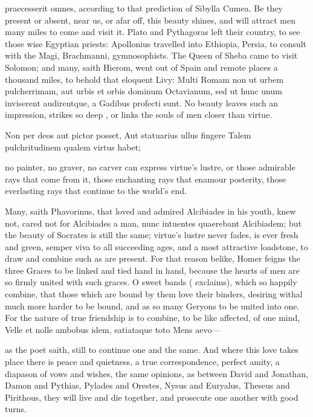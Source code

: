 {praecesserit omnes, according to that prediction of Sibylla
Cumea. Be they present or absent, near us, or afar off, this beauty
shines, and will attract men many miles to come and visit it. Plato and
Pythagoras left their country, to see those wise Egyptian priests:
Apollonius travelled into Ethiopia, Persia, to consult with the Magi,
Brachmanni, gymnosophists. The Queen of Sheba came to visit Solomon;
and many, saith Hierom, went out of Spain and remote places a
thousand miles, to behold that eloquent Livy: Multi Romam non ut
urbem pulcherrimam, aut urbis et orbis dominum Octavianum, sed ut hunc
unum inviserent audirentque, a Gadibus profecti sunt. No beauty leaves
such an impression, strikes so deep , or links the souls of men
closer than virtue.

Non per deos aut pictor posset,
Aut statuarius ullus fingere
Talem pulchritudinem qualem virtus habet;

no painter, no graver, no carver can express virtue's lustre, or those
admirable rays that come from it, those enchanting rays that enamour
posterity, those everlasting rays that continue to the world's end.

Many, saith Phavorinus, that loved and admired Alcibiades in his youth,
knew not, cared not for Alcibiades a man, nunc intuentes quaerebant
Alcibiadem; but the beauty of Socrates is still the same;
virtue's lustre never fades, is ever fresh and green, semper viva
to all succeeding ages, and a most attractive loadstone, to draw and
combine such as are present. For that reason belike, Homer feigns the
three Graces to be linked and tied hand in hand, because the hearts of
men are so firmly united with such graces. O sweet bands (\Seneca{}
exclaims), which so happily combine, that those which are bound by them
love their binders, desiring withal much more harder to be bound, and
as so many Geryons to be united into one. For the nature of true
friendship is to combine, to be like affected, of one mind,
Velle et nolle ambobus idem, satiataque toto
Mens aevo---

as the poet saith, still to continue one and the same. And where this
love takes place there is peace and quietness, a true correspondence,
perfect amity, a diapason of vows and wishes, the same opinions, as
between  David and Jonathan, Damon and Pythias, Pylades and
Orestes, Nysus and Euryalus, Theseus and Pirithous, they
will live and die together, and prosecute one another with good turns.

}
